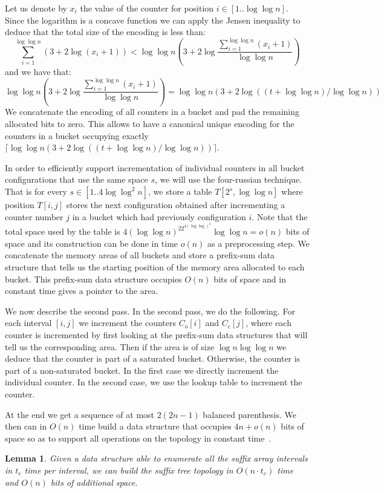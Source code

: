 \documentclass[a4paper]{article}
\newtheorem{lemma}{Lemma}
\begin{document}
Let us denote by $x_i$ the value of the counter for position $i\in[1..\log\log n]$. Since the logarithm is a concave function we can apply the Jensen inequality to deduce that the total size of the encoding is less than: 
$$\sum_{i=1}^{\log\log n}(3+2\log (x_i+1))<\log\log n(3+2\log \frac{\sum_{i=1}^{\log\log n} (x_i+1)}{\log\log n})$$ 
and we have that:
$$\log\log n(3+2\log \frac{\sum_{i=1}^{\log\log n} (x_i+1)}{\log\log n})=\log\log n(3+2\log((t+\log\log n)/\log\log n))$$ 
We concatenate the encoding of all counters in a bucket and pad the remaining allocated bits to zero. 
This allows to have a canonical unique encoding for the counters in a bucket occupying exactly $\lceil \log\log n(3+2\log((t+\log\log n)/\log\log n))\rceil$. 

In order to efficiently support incrementation of individual counters in all bucket configurations that use the same space $s$, we will use the four-russian technique. That is for every $s\in[1..4\log\log^2 n]$, we store a table $T[2^s,\log\log n]$ where position $T[i,j]$ stores the next configuration obtained after incrementing a counter number $j$ in a bucket which had previously configuration $i$. Note that the total space used by the table is $4(\log\log n)^22^{4(\log\log)^2}\log\log n=o(n)$ bits of space and its construction can be done in time $o(n)$ as a preprocessing step. 
We concatenate the memory areas of all buckets and store a prefix-sum data structure that tells us the starting position of the memory area allocated to each bucket. This prefix-sum data structure occupies $O(n)$ bits of space and in constant time gives a pointer to the area. 

We now describe the second pass. In the second pass, we do the following. For each interval $[i,j]$ we increment the counters $C_o[i]$ and $C_c[j]$, where each counter is incremented by first looking at the prefix-sum data structures that will tell us the corresponding area. Then if the area is of size $\log n\log\log n$ we deduce that the counter is part of a saturated bucket. Otherwise, the counter is part of a non-saturated bucket. In the first case we directly increment the individual counter. In the second case, we use the lookup table to increment the counter. 

At the end we get a sequence of at most $2(2n-1)$ balanced parenthesis. We then can in $O(n)$ time build a data structure that occupies $4n+o(n)$ bits of space so as to support all operations on the topology in constant time~\cite{SNsoda10,NStalg14}. 
\begin{lemma}
\label{lemma:tree_topology}
Given a data structure able to enumerate all the suffix array intervals in $t_e$ time per interval, we can build the suffix tree topology in $O(n\cdot t_e)$ time and $O(n)$ bits of additional space. 
\end{lemma}
\end{document}
